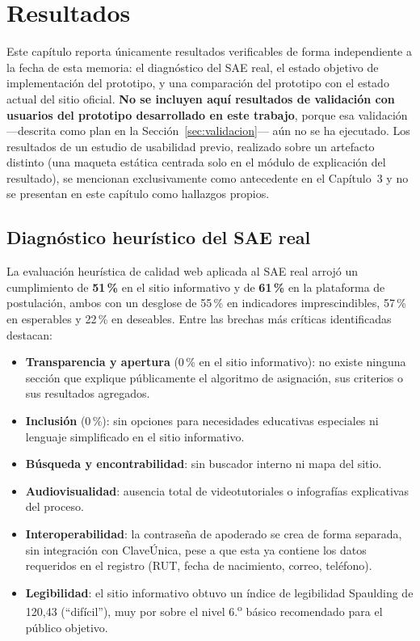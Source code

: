 \chapter{Resultados}

Este capítulo reporta únicamente resultados verificables de forma independiente a la fecha de esta memoria: el diagnóstico del SAE real, el estado objetivo de implementación del prototipo, y una comparación del prototipo con el estado actual del sitio oficial. \textbf{No se incluyen aquí resultados de validación con usuarios del prototipo desarrollado en este trabajo}, porque esa validación —descrita como plan en la Sección~\ref{sec:validacion}— aún no se ha ejecutado. Los resultados de un estudio de usabilidad previo, realizado sobre un artefacto distinto (una maqueta estática centrada solo en el módulo de explicación del resultado), se mencionan exclusivamente como antecedente en el Capítulo~3 y no se presentan en este capítulo como hallazgos propios.

\section{Diagnóstico heurístico del SAE real}

La evaluación heurística de calidad web aplicada al SAE real \citep{moralesvargas2026informe} arrojó un cumplimiento de \textbf{51\,\%} en el sitio informativo y de \textbf{61\,\%} en la plataforma de postulación, ambos con un desglose de 55\,\% en indicadores imprescindibles, 57\,\% en esperables y 22\,\% en deseables. Entre las brechas más críticas identificadas destacan:

\begin{itemize}
    \item \textbf{Transparencia y apertura} (0\,\% en el sitio informativo): no existe ninguna sección que explique públicamente el algoritmo de asignación, sus criterios o sus resultados agregados.
    \item \textbf{Inclusión} (0\,\%): sin opciones para necesidades educativas especiales ni lenguaje simplificado en el sitio informativo.
    \item \textbf{Búsqueda y encontrabilidad}: sin buscador interno ni mapa del sitio.
    \item \textbf{Audiovisualidad}: ausencia total de videotutoriales o infografías explicativas del proceso.
    \item \textbf{Interoperabilidad}: la contraseña de apoderado se crea de forma separada, sin integración con ClaveÚnica, pese a que esta ya contiene los datos requeridos en el registro (RUT, fecha de nacimiento, correo, teléfono).
    \item \textbf{Legibilidad}: el sitio informativo obtuvo un índice de legibilidad Spaulding de 120{,}43 (``difícil''), muy por sobre el nivel 6.\textsuperscript{o} básico recomendado para el público objetivo.
\end{itemize}

